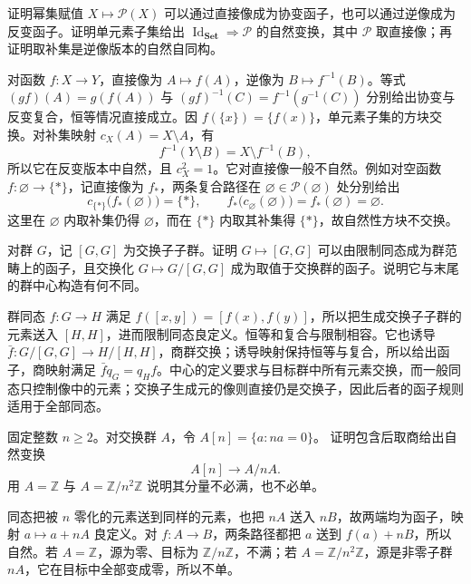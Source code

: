 \begin{exercise}\label{b4:ex:01-powerset-variance}
	证明幂集赋值 \(X\mapsto\mathcal P(X)\) 可以通过直接像成为协变函子，也可以通过逆像成为反变函子。证明单元素子集给出 \(\operatorname{Id}_{\mathbf{Set}}\Rightarrow\mathcal P\) 的自然变换，其中 \(\mathcal P\) 取直接像；再证明取补集是逆像版本的自然自同构。
\end{exercise}
\begin{solution}
	对函数 \(f:X\rightarrow Y\)，直接像为 \(A\mapsto f(A)\)，逆像为 \(B\mapsto f^{-1}(B)\)。等式 \((gf)(A)=g(f(A))\) 与 \((gf)^{-1}(C)=f^{-1}(g^{-1}(C))\) 分别给出协变与反变复合，恒等情况直接成立。因 \(f(\{x\})=\{f(x)\}\)，单元素子集的方块交换。对补集映射 \(c_X(A)=X\setminus A\)，有
	\[
		f^{-1}(Y\setminus B)=X\setminus f^{-1}(B),
	\]
	所以它在反变版本中自然，且 \(c_X^2=1\)。它对直接像一般不自然。例如对空函数 \(f:\varnothing\rightarrow\{*\}\)，记直接像为 \(f_*\)，两条复合路径在 \(\varnothing\in\mathcal P(\varnothing)\) 处分别给出
	\[
		c_{\{*\}}\bigl(f_*(\varnothing)\bigr)=\{*\}, \qquad f_*\bigl(c_{\varnothing}(\varnothing)\bigr)=f_*(\varnothing)=\varnothing.
	\]
	这里在 \(\varnothing\) 内取补集仍得 \(\varnothing\)，而在 \(\{*\}\) 内取其补集得 \(\{*\}\)，故自然性方块不交换。
\end{solution}

\begin{exercise}\label{b4:ex:01-abelianization-functor}
	对群 \(G\)，记 \([G,G]\) 为交换子子群。证明 \(G\mapsto[G,G]\) 可以由限制同态成为群范畴上的函子，且交换化 \(G\mapsto G/[G,G]\) 成为取值于交换群的函子。说明它与末尾的群中心构造有何不同。
\end{exercise}
\begin{solution}
	群同态 \(f:G\rightarrow H\) 满足 \(f([x,y])=[f(x),f(y)]\)，所以把生成交换子子群的元素送入 \([H,H]\)，进而限制同态良定义。恒等和复合与限制相容。它也诱导 \(\bar f:G/[G,G]\rightarrow H/[H,H]\)，商群交换；诱导映射保持恒等与复合，所以给出函子，商映射满足 \(\bar f q_G=q_Hf\)。中心的定义要求与目标群中所有元素交换，而一般同态只控制像中的元素；交换子生成元的像则直接仍是交换子，因此后者的函子规则适用于全部同态。
\end{solution}

\begin{exercise}\label{b4:ex:01-n-torsion-quotient}
	固定整数 \(n\ge2\)。对交换群 \(A\)，令 \(A[n]=\{a:na=0\}\)。 证明包含后取商给出自然变换
	\[
		A[n]\longrightarrow A/nA.
	\]
	用 \(A=\mathbb Z\) 与 \(A=\mathbb Z/n^2\mathbb Z\) 说明其分量不必满，也不必单。
\end{exercise}
\begin{solution}
	同态把被 \(n\) 零化的元素送到同样的元素，也把 \(nA\) 送入 \(nB\)，故两端均为函子，映射 \(a\mapsto a+nA\) 良定义。对 \(f:A\rightarrow B\)，两条路径都把 \(a\) 送到 \(f(a)+nB\)，所以自然。若 \(A=\mathbb Z\)，源为零、目标为 \(\mathbb Z/n\mathbb Z\)，不满；若 \(A=\mathbb Z/n^2\mathbb Z\)，源是非零子群 \(nA\)，它在目标中全部变成零，所以不单。
\end{solution}

